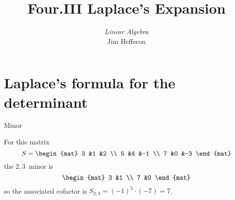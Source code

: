 \documentclass[10pt,t]{beamer}
\title[Laplace's Expansion] %
{Four.III Laplace's Expansion}
\author{\textit{Linear Algebra} \\ {\small Jim Hef{}feron}}
\institute{
  \texttt{http://joshua.smcvt.edu/linearalgebra}
}
\date{}
\begin{document}
\begin{frame}
  \titlepage
\end{frame}




\section{Laplace's formula for the determinant}
\begin{frame}
\ex[ex:ExpThreeFirstRow]
\end{frame}
\begin{frame}
\end{frame}
\begin{frame}
\pause
{}
\end{frame}




\begin{frame}{Minor}
\df[df:Minor]

\pause
\ex For this matrix
\begin{equation*}
  S=
  \begin{mat}
    3 &1 &2 \\
    5 &4 &-1 \\
    7 &0 &-3
  \end{mat}
\end{equation*}
the $2,3$~minor is 
\begin{equation*}
  \begin{mat}
    3 &1 \\
    7 &0
  \end{mat}
\end{equation*}
so the associated cofactor is $S_{2,3}=(-1)^{5}\cdot (-7)=7$.
\end{frame}
\end{document}

